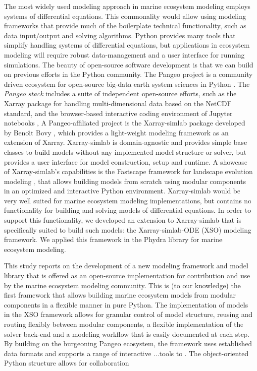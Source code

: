 \documentclass[journal abbreviation, manuscript]{copernicus}
\begin{document}
The most widely used modeling approach in marine ecosystem modeling employs systems of differential equations. This commonality would allow using modeling frameworks that provide much of the boilerplate technical functionality, such as data input/output and solving algorithms. Python provides many tools that simplify handling systems of differential equations, but applications in ecosystem modeling will require robust data-management and a user interface for running simulations. The beauty of open-source software development is that we can build on previous efforts in the Python community.
The Pangeo project is a community driven ecosystem for open-source big-data earth system sciences in Python \citep{Eynard-Bontemps2019TheCNES}. The \textit{Pangeo stack} includes a suite of independent open-source efforts, such as the Xarray package \citep{Hoyer2017Xarray:Python} for handling multi-dimensional data based on the NetCDF standard, and the browser-based interactive coding environment of Jupyter notebooks \citep{Kluyver2016JupyterWorkflows},
A Pangeo-affiliated project is the Xarray-simlab package developed by Beno\^{\i}t Bovy \citep{Bovy2018Xarray-simlab:Interactively}, which provides a light-weight modeling framework as an extension of Xarray. Xarray-simlab is domain-agnostic and provides simple base classes to build models without any implemented model structure or solver, but provides a user interface for model construction, setup and runtime.
A showcase of Xarray-simlab's capabilities is the Fastscape framework for landscape evolution modeling \citep{benoit_bovy_2020_3840917}, that allows building models from scratch using modular components in an optimized and interactive Python environment. Xarray-simlab would be very well suited for marine ecosystem modeling implementations, but contains no functionality for building and solving models of differential equations. In order to support this functionality, we developed an extension to Xarray-simlab that is specifically suited to build such models: the Xarray-simlab-ODE (XSO) modeling framework. We applied this framework in the Phydra library for marine ecosystem modeling. 


This study reports on the development of a new modeling framework and model library that is offered as an open-source implementation for contribution and use by the marine ecosystem modeling community. This is (to our knowledge) the first framework that allows building marine ecosystem models from modular components in a flexible manner in pure Python. The implementation of models in the XSO framework allows for granular control of model structure, reusing and routing flexibly between modular components, a flexible implementation of the solver back-end and a modeling workflow that is easily documented at each step.
By building on the burgeoning Pangeo ecosystem, the framework uses established data formats and supports a range of interactive ...tools to . The object-oriented Python structure allows for collaboration 
\end{document}
